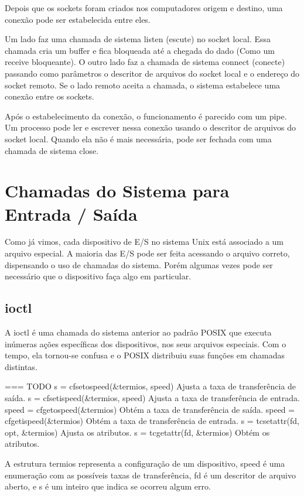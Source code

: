 Depois que os sockets foram criados nos computadores origem e destino, uma conexão pode ser estabelecida entre eles.

Um lado faz uma chamada de sistema listen (escute) no socket local. Essa chamada cria um buffer e fica bloqueada até a chegada do dado (Como um receive bloqueante). O outro lado faz a chamada de sistema connect (conecte) passando como parâmetros o descritor de arquivos do socket local e o endereço do socket remoto. Se o lado remoto aceita a chamada, o sistema estabelece uma conexão entre os sockets.

Após o estabelecimento da conexão, o funcionamento é parecido com um pipe. Um processo pode ler e escrever nessa conexão usando o descritor de arquivos do socket local. Quando ela não é mais necessária, pode ser fechada com uma chamada de sistema close.

\section{Chamadas do Sistema para Entrada / Saída}

Como já vimos, cada dispositivo de E/S no sistema Unix está associado a um arquivo especial. A maioria das E/S pode ser feita acessando o arquivo correto, dispensando o uso de chamadas do sistema. Porém algumas vezes pode ser necessário que o dispositivo faça algo em particular.

\subsection{ioctl}

A ioctl é uma chamada do sistema anterior ao padrão POSIX que executa inúmeras ações específicas dos dispositivos, nos seus arquivos especiais. Com o tempo, ela tornou-se confusa e o POSIX distribuiu suas funções em chamadas distintas.

=== TODO
s = cfsetospeed(\&termios, speed)
Ajusta a taxa de transferência de saída.
s = cfsetispeed(\&termios, speed)
Ajusta a taxa de transferência de entrada.
speed = cfgetospeed(\&termios)
Obtém a taxa de transferência de saída.
speed = cfgetispeed(\&termios)
Obtém a taxa de transferência de entrada.
s = tcsetattr(fd, opt, \&termios)
Ajusta os atributos.
s = tcgetattr(fd, \&termios)
Obtém os atributos.

A estrutura termios representa a configuração de um dispositivo, speed é uma enumeração com as possíveis taxas de transferência, fd é um descritor de arquivo aberto, e s é um inteiro que indica se ocorreu algum erro.


